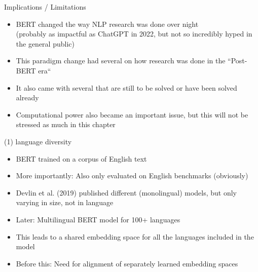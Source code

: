 \begin{frame}{Implications / Limitations}

\vfill

	\begin{itemize}
		\item BERT changed the way NLP research was done over night\\
					(probably as impactful as ChatGPT in 2022, but not so incredibly hyped in the general public)
		\item This paradigm change had several  on how research was done in the ``Post-BERT era``
		\item It also came with several  that are still to be solved or have been solved already
		\item Computational power also became an important issue, but this will not be stressed as much in this chapter
	\end{itemize}

\vfill

\end{frame}


\begin{frame}{(1) language diversity}

\vfill

	\begin{itemize}
		\item BERT trained on a corpus of English text
		\item More importantly: Also only evaluated on English benchmarks (obviously)
		\item Devlin et al. (2019) published different (monolingual) models, but only varying in size, not in language
		\item Later: Multilingual BERT model  for 100+ languages
		\item This leads to a shared embedding space for all the languages included in the model
		\item Before this: Need for alignment of separately learned embedding spaces
	\end{itemize}

\vfill

\end{frame}

